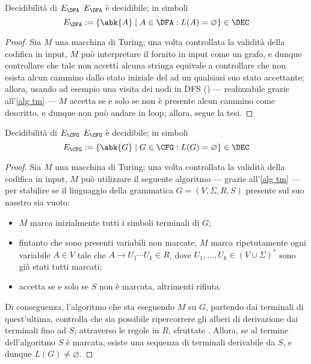 \documentclass[a4paper, 12pt]{report}
\begin{document}
    \begin{framedthm}[label={dec e_dfa}]{Decidibilità di $E_\DFA$}
        $E_\DFA$ è decidibile; in simboli $$E_\DFA := \{\abk{A} \mid A \in \DFA: L(A) = \varnothing \} \in \DEC$$
    \end{framedthm}

    \begin{proof}
        Sia $M$ una macchina di Turing; una volta controllata la validità della codifica in input, $M$ può interpretare il \DFA fornito in input come un grafo, e dunque controllare che tale \DFA non accetti alcuna stringa equivale a controllare che non esista alcun cammino dallo stato iniziale del \DFA ad un qualsiasi suo stato accettante; allora, usando ad esempio una visita dei nodi in DFS () --- realizzabile grazie all'\cref{alg tm} --- $M$ accetta se e solo se non è presente alcun cammino come descritto, e dunque non può andare in loop; allora, segue la tesi.
    \end{proof}

    \begin{framedthm}{Decidibilità di $E_\CFG$}
        $E_\CFG$ è decidibile; in simboli $$E_\CFG := \{\abk{G} \mid G \in \CFG: L(G) = \varnothing \} \in \DEC$$
    \end{framedthm}

    \begin{proof}
        Sia $M$ una macchina di Turing; una volta controllata la validità della codifica in input, $M$ può utilizzare il seguente algoritmo --- grazie all'\cref{alg tm} --- per stabilire se il linguaggio della grammatica $G = (V, \Sigma, R, S)$ presente sul suo nasstro sia vuoto:

        \begin{itemize}
            \item $M$ marca inizialmente tutti i simboli terminali di $G$;
            \item fintanto che sono presenti variabili non marcate, $M$ marca ripetutamente ogni variabile $A \in V$ tale che $A \to U_1 \cdots U_k \in R$, dove $U_1, \ldots, U_k \in (V \cup \Sigma)^*$ sono già stati tutti marcati;
            \item accetta se e solo se $S$ non è marcata, altrimenti rifiuta.
        \end{itemize}

        Di conseguenza, l'algoritmo che sta eseguendo $M$ su $G$, partendo dai terminali di quest'ultima, controlla che sia possibile ripercorrere gli alberi di derivazione dai terminali fino ad $S$, attraverso le regole in $R$, sfruttate . Allora, se al termine dell'algoritmo $S$ è marcata, esiste una sequenza di terminali derivabile da $S$, e dunque $L(G) \neq \varnothing$.
    \end{proof}
\end{document}
